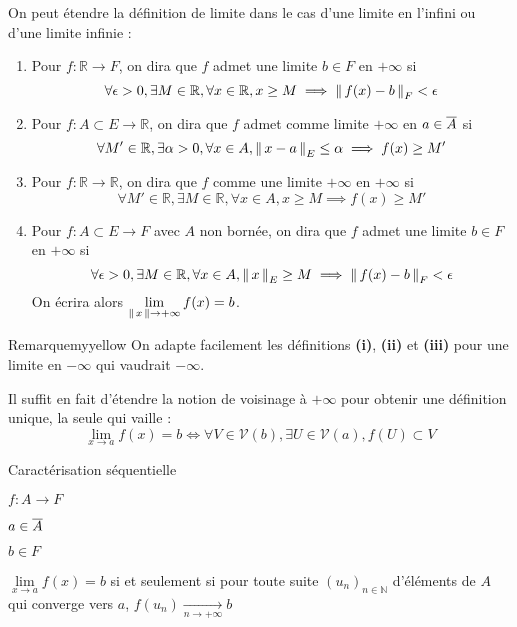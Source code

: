     On peut étendre la définition de limite dans le cas d’une limite en l’infini ou d’une limite infinie : 

    \begin{defi}{}{}
        \begin{enumerate}
            \item Pour $f : \mathbb{R} \rightarrow F$, on dira que $f$ admet une limite $b \in F$ en $+ \infty$ si 
            \[ \forall \epsilon > 0, \exists M \in \mathbb{R}, \forall x \in \mathbb{R}, x \geq M \implies \left\lVert\,f(x)-b\,\right\rVert_F < \epsilon \] 
            \item Pour $f : A \subset E \rightarrow \mathbb{R}$, on dira que $f$ admet comme limite $+ \infty$ en $a \in \overline{A}$ si 
            \[ \forall M' \in \mathbb{R}, \exists \alpha > 0, \forall x \in A, \left\lVert\,x-a\,\right\rVert_E \leq \alpha \implies f(x) \geq M' \] 
            \item Pour $f : \mathbb{R} \rightarrow \mathbb{R}$, on dira que $f$ comme une limite $+\infty$ en $+\infty$ si 
            \[ \forall M' \in \mathbb{R}, \exists M \in \mathbb{R}, \forall x \in A, x \geq M \implies f(x) \geq M' \] 
            \item Pour $f : A \subset E \rightarrow F$ avec $A$ non bornée, on dira que $f$ admet une limite $b \in F$ en $+ \infty$ si 
            \[ \forall \epsilon > 0, \exists M \in \mathbb{R}, \forall x \in A, \left\lVert\,x\,\right\rVert_E \geq M \implies \left\lVert\,f(x)-b\,\right\rVert_F < \epsilon \] 
            On écrira alors $\lim\limits_{\left\lVert\,x\,\right\rVert \rightarrow + \infty} f(x) = b$.
        \end{enumerate}
    \end{defi}

    \begin{omed}{Remarque}{myyellow}
        On adapte facilement les définitions \textbf{(i)}, \textbf{(ii)} et \textbf{(iii)} pour une limite en $-\infty$ qui vaudrait $-\infty$.

        Il suffit en fait d’étendre la notion de voisinage à $+ \infty$ pour obtenir une définition unique, la seule qui vaille :
        \[ \lim\limits_{x \rightarrow a} f(x) = b \iff \forall V \in \mathcal{V}(b), \exists U \in \mathcal{V}(a), f(U) \subset V \]
    \end{omed}

    \begin{prop}{Caractérisation séquentielle}{}
        \begin{soient}
            \item $f : A \rightarrow F$
            \item $a \in \overline{A}$
            \item $b \in F$
        \end{soient}
        $\lim\limits_{x \rightarrow a} f(x) = b$ si et seulement si pour toute suite $(u_n)_{n \in \mathbb{N}}$ d’éléments de $A$ qui converge vers $a$, $f(u_n) \underset{n \rightarrow +\infty}{\longrightarrow} b$
    \end{prop}

